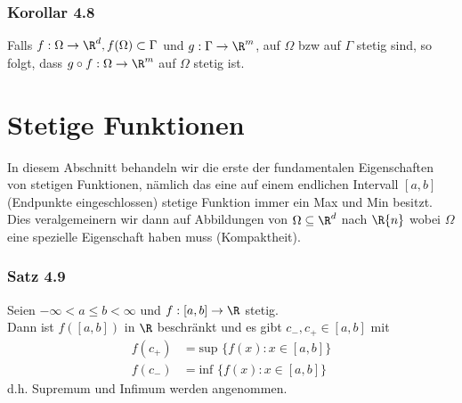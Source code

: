 \subsubsection*{Korollar 4.8}
Falls $f:\Omega \to \R^{d}, f(\Omega) \subset \Gamma$ und $g:\Gamma \to \R^{m}$, auf $\Omega$ bzw auf $\Gamma$ stetig sind, so folgt, dass $g\circ f:\Omega\to\R^{m}$ auf $\Omega$ stetig ist.  
\section{Stetige Funktionen}
In diesem Abschnitt behandeln wir die erste der fundamentalen Eigenschaften von stetigen Funktionen, nämlich das eine auf einem endlichen Intervall $[a,b]$ (Endpunkte eingeschlossen) stetige Funktion immer ein Max und Min besitzt. Dies veralgemeinern wir dann auf Abbildungen von $\Omega\subseteq\R^{d}$ nach $\R{n}$ wobei $\Omega$ eine spezielle Eigenschaft haben muss (Kompaktheit).

\subsubsection*{Satz 4.9}
Seien $-\infty < a \leq b < \infty$ und $f:[a,b] \to \R$ stetig. \\
\noindent Dann ist $f([a,b])$ in $\R$ beschränkt und es gibt $c_{-}, c_{+} \in [a,b]$ mit \begin{align*} f(c_{+}) &= \text{sup } \{ f(x):x\in[a,b]\} \\ f(c_{-}) &= \text{inf }\{ f(x):x\in[a,b]\} \end{align*} d.h. Supremum und Infimum werden angenommen.

